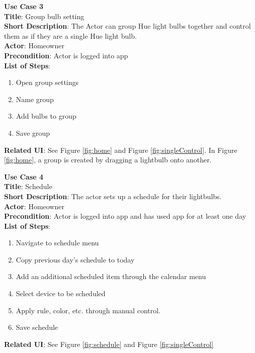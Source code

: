 \documentclass[12pt]{article}
\begin{document}
\begin{samepage}
  \begin{framed}
    \textbf{Use Case 3} \\
    \textbf{Title}: Group bulb setting \\
    \textbf{Short Description}: The Actor can group Hue light bulbs together and control them as if they are a single Hue light bulb. \\
    \textbf{Actor}: Homeowner \\
    \textbf{Precondition}: Actor is logged into app \\
    \textbf{List of Steps}:
    \begin{enumerate}
      \item Open group settings
      \item Name group
      \item Add bulbs to group
      \item Save group
    \end{enumerate}
    \textbf{Related UI}:  See Figure \ref{fig:home} and Figure \ref{fig:singleControl}. In Figure \ref{fig:home}, a group is created by dragging a lightbulb onto another. 
  \end{framed}
\end{samepage}

\begin{samepage}
  \begin{framed}
    \textbf{Use Case 4} \\
    \textbf{Title}: Schedule \\
    \textbf{Short Description}: The actor sets up a schedule for their lightbulbs. \\
    \textbf{Actor}: Homeowner \\
    \textbf{Precondition}: Actor is logged into app and has used app for at least one day \\
    \textbf{List of Steps}:
    \begin{enumerate}
      \item Navigate to schedule menu
      \item Copy previous day's schedule to today
      \item Add an additional scheduled item through the calendar menu
      \item Select device to be scheduled
      \item Apply rule, color, etc. through manual control.
      \item Save schedule
    \end{enumerate}
    \textbf{Related UI}:  See Figure \ref{fig:schedule} and Figure \ref{fig:singleControl}
  \end{framed}
\end{samepage}
\end{document}
